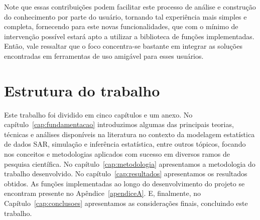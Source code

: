 Note que essas contribuições podem facilitar este processo de análise e construção do conhecimento por parte do usuário, tornando tal experiência mais simples e completa, fornecendo para este novas funcionalidades, que com o mínimo de intervenção possível estará apto a utilizar a biblioteca de funções implementadas. 
Então, vale ressaltar que o foco concentra-se bastante em integrar as soluções encontradas em ferramentas de uso amigável para esses usuários.

\section{Estrutura do trabalho}

Este trabalho foi dividido em cinco capítulos e um anexo. 
No capítulo~\ref{cap:fundamentacao} introduzimos algumas das principais teorias, técnicas e análises disponíveis na literatura no contexto da modelagem estatística de dados SAR, simulação e inferência estatística, entre outros tópicos, focando nos conceitos e metodologias aplicados com sucesso em diversos ramos de pesquisa científica.
No capítulo~\ref{cap:metodologia} apresentamos a metodologia do trabalho desenvolvido.
No capítulo~\ref{cap:resultados} apresentamos os resultados obtidos.
As funções implementadas ao longo do desenvolvimento do projeto se encontram presente no Apêndice~\ref{apendiceA}.
E, finalmente, no Capítulo~\ref{cap:conclusoes} apresentamos as considerações finais, concluindo este trabalho.

\newpage\lhead{\rightmark}
